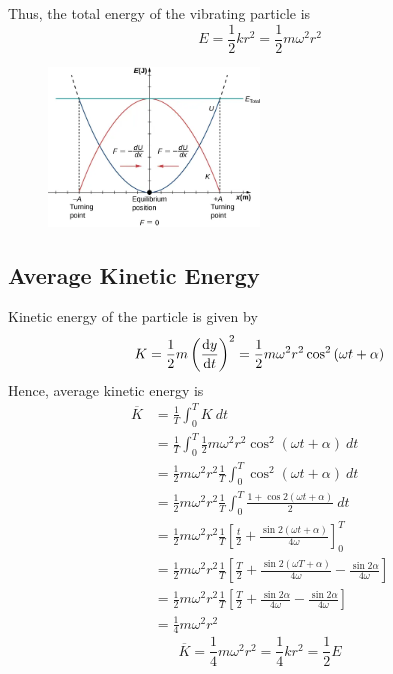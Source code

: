 \documentclass[12pt]{article}
\begin{document}
Thus, the total energy of the vibrating particle is
\begin{equation}
    \boxed{ E = \frac{1}{2} k r^2 = \frac{1}{2} m \omega^2 r^2 }
\end{equation}

\begin{figure}[htpb]
    \centering
    \includegraphics[width=0.5\textwidth]{2.png}
\end{figure}

\subsection{Average Kinetic Energy}
Kinetic energy of the particle is given by
\begin{equation}
    K = \frac{1}{2} m \left( \dv{y}{t} \right)^2 = \frac{1}{2} m \omega^2 r^2 \cos^2{(\omega t + \alpha)}
\end{equation}
Hence, average kinetic energy is
\begin{align*}
    \overline{K} &= \frac{1}{T} \int_{0}^{T} K \: dt \\
    &= \frac{1}{T} \int_{0}^{T} \frac{1}{2} m \omega^2 r^2 \cos^2{(\omega t + \alpha)} \: dt \\
    &= \frac{1}{2} m \omega^2 r^2 \frac{1}{T} \int_{0}^{T} \cos^2{(\omega t + \alpha)} \: dt \\
    &= \frac{1}{2} m \omega^2 r^2 \frac{1}{T} \int_{0}^{T} \frac{1 + \cos{2(\omega t + \alpha)}}{2} \: dt \\
    &= \frac{1}{2} m \omega^2 r^2 \frac{1}{T} \left[ \frac{t}{2} + \frac{\sin{2(\omega t + \alpha)}}{4\omega} \right]_{0}^{T} \\
    &= \frac{1}{2} m \omega^2 r^2 \frac{1}{T} \left[ \frac{T}{2} + \frac{\sin{2(\omega T + \alpha)}}{4\omega} - \frac{\sin{2\alpha}}{4\omega} \right] \\
    &= \frac{1}{2} m \omega^2 r^2 \frac{1}{T} \left[ \frac{T}{2} + \frac{\sin{2\alpha}}{4\omega} - \frac{\sin{2\alpha}}{4\omega} \right] \\
    &= \frac{1}{4} m \omega^2 r^2
\end{align*}
\begin{equation}
    \boxed{ \overline{K} = \frac{1}{4} m \omega^2 r^2 = \frac{1}{4}k r^2 = \frac{1}{2} E }
\end{equation}
\end{document}
